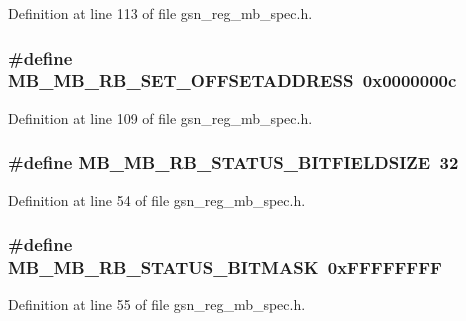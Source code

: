 Definition at line 113 of file gsn\_\-reg\_\-mb\_\-spec.h.

\hypertarget{a00562_ad21159537ea6e9cdc0da9ba58c720d7a}{
\subsubsection[{MB\_\-MB\_\-RB\_\-SET\_\-OFFSETADDRESS}]{\setlength{\rightskip}{0pt plus 5cm}\#define MB\_\-MB\_\-RB\_\-SET\_\-OFFSETADDRESS~0x0000000c}}
\label{a00562_ad21159537ea6e9cdc0da9ba58c720d7a}


Definition at line 109 of file gsn\_\-reg\_\-mb\_\-spec.h.

\hypertarget{a00562_a5b92f9745f3c6cc22f2f05050045f194}{
\subsubsection[{MB\_\-MB\_\-RB\_\-STATUS\_\-BITFIELDSIZE}]{\setlength{\rightskip}{0pt plus 5cm}\#define MB\_\-MB\_\-RB\_\-STATUS\_\-BITFIELDSIZE~32}}
\label{a00562_a5b92f9745f3c6cc22f2f05050045f194}


Definition at line 54 of file gsn\_\-reg\_\-mb\_\-spec.h.

\hypertarget{a00562_a5896996a4d843251872e78064f2545c6}{
\subsubsection[{MB\_\-MB\_\-RB\_\-STATUS\_\-BITMASK}]{\setlength{\rightskip}{0pt plus 5cm}\#define MB\_\-MB\_\-RB\_\-STATUS\_\-BITMASK~0xFFFFFFFF}}
\label{a00562_a5896996a4d843251872e78064f2545c6}


Definition at line 55 of file gsn\_\-reg\_\-mb\_\-spec.h.

